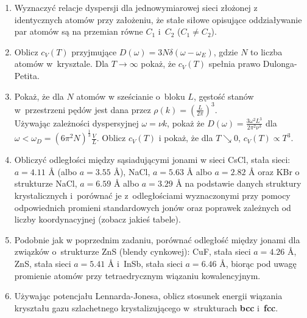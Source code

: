 \documentclass[a4paper,11pt]{article}
\begin{document}




\begin{enumerate}

\item Wyznaczyć relacje dyspersji dla jednowymiarowej sieci złożonej z
  identycznych atomów przy założeniu, że stałe siłowe opisujące
  oddziaływanie par atomów są na przemian równe $C_{ 1 }$ i~$C_{ 2 }$
  ($C_{ 1 } \neq C_{ 2 }$).

\item Oblicz $c_{ V }( T )$ przyjmujące
  $D( \omega ) = 3 N \delta( \omega - \omega_{ E } )$, gdzie $N$ to
  liczba atomów w~krysztale. Dla $T \to \infty$ pokaż, że
  $c_{ V }( T )$ spełnia prawo Dulonga-Petita.

\item Pokaż, że dla $N$ atomów w sześcianie o~bloku $L$, gęstość stanów w~przestrzeni pędów jest dana przez $\rho( k ) = \left( \frac{ L }{ 2\pi } \right)^{ 3 }$. \\
  Używając zależności dyspersyjnej $\omega = \nu k$, pokaż że
  $D( \omega ) = \frac{ 3 \omega^{ 2 } L^{ 3 } }{ 2\pi^{ 2 } \nu^{ 3 }
  }$ dla
  $\omega < \omega_{ D } = ( 6 \pi^{ 2 } N )^{ \frac{ 1 }{ 3 } }
  \frac{ V }{ L }$. Oblicz $c_{ V }( T )$ i pokaż, że dla
  $T \searrow 0$, $c_{ V }( T ) \propto T^{ 3 }$.
\item Obliczyć odległości między sąsiadującymi jonami w sieci CsCl,
  stała sieci: $a = 4.11$ \AA{} (albo $a = 3.55$ \AA), NaCl,
  $a = 5.63$ \AA{} albo $a = 2.82$ \AA{} oraz KBr o strukturze NaCl,
  $a = 6.59$ \AA{} albo $a = 3.29$ \AA{} na podstawie danych struktury
  krystalicznych i~porównać je z~odległościami wyznaczonymi przy
  pomocy odpowiednich promieni standardowych jonów oraz poprawek
  zależnych od liczby koordynacyjnej (zobacz jakieś tabele).

\item Podobnie jak w poprzednim zadaniu, porównać odległość między
  jonami dla związków o~strukturze ZnS (blendy cynkowej): CuF, stała
  sieci $a = 4.26$ \AA, ZnS, stała sieci $a = 5.41$ \AA{} i~InSb,
  stała sieci $a = 6.46$ \AA, biorąc pod uwagę promienie atomów przy
  tetraedrycznym wiązaniu kowalencyjnym.

\item Używając potencjału Lennarda-Jonesa, oblicz stosunek energii
  wiązania kryształu gazu szlachetnego krystalizującego w~strukturach
  \textbf{bcc} i~\textbf{fcc}.


\end{enumerate}
\end{document}
